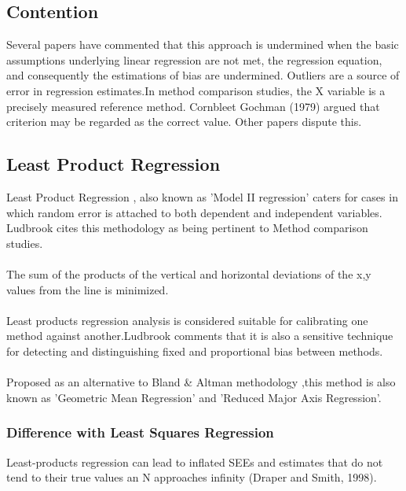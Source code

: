 


\subsection{Contention }
Several papers have commented that this approach is undermined
when the basic assumptions underlying linear regression are not
met, the regression equation, and consequently the estimations of
bias are undermined. Outliers are a source of error in regression
estimates.In method comparison studies, the X variable is a
precisely measured reference method. Cornbleet Gochman (1979)
argued that criterion may be regarded as the correct value. Other
papers dispute this.
\subsection{Least Product Regression}
Least Product Regression , also known as 'Model II regression'
caters for cases in which random error is attached to both
dependent and independent variables. Ludbrook cites this
methodology as being pertinent to Method comparison studies.
\\
\\
The sum of the products of the vertical and horizontal deviations
of the x,y values from the line is minimized.
\\
\\
Least products regression analysis is considered suitable for
calibrating one method against another.Ludbrook comments that it
is also a sensitive technique for detecting and distinguishing
fixed and proportional bias between methods.
\\
\\
Proposed as an alternative to Bland \& Altman methodology ,this
method is also known as 'Geometric Mean Regression' and 'Reduced
Major Axis Regression'.

\subsubsection{Difference with Least Squares Regression}
Least-products regression can lead to inflated SEEs and estimates
that do not tend to their true values an N approaches infinity
(Draper and Smith, 1998).
